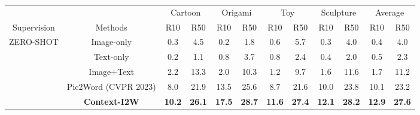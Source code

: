 \documentclass[letterpaper]{article} \usepackage{aaai24}  \usepackage{times}  \usepackage{helvet}  \usepackage{courier}  \usepackage[hyphens]{url}  \usepackage{graphicx} \urlstyle{rm} \def\UrlFont{\rm}  \usepackage{natbib}  \usepackage{caption} \frenchspacing  \setlength{\pdfpagewidth}{8.5in} \setlength{\pdfpageheight}{11in} \usepackage{algorithm}
\begin{document}
\begin{table*}[t]
\centering
\scalebox{1.11}
{\scriptsize
\begin{tabular}{cccccccccccc}
\toprule
                           &              & \multicolumn{2}{c}{Cartoon}                       & \multicolumn{2}{c}{Origami}                        & \multicolumn{2}{c}{Toy}                            & \multicolumn{2}{c}{Sculpture}                      & \multicolumn{2}{c}{Average}   \\  \cmidrule(lr){3-4}\cmidrule(lr){5-6}\cmidrule(lr){7-8}\cmidrule(lr){9-10}\cmidrule(lr){11-12}
Supervision                & Methods      & R10          & R50                                & R10           & R50                                & R10           & R50                                & R10           & R50                                & R10           & R50           \\ \hline
\multirow{5}{*}{ZERO-SHOT} & Image-only   & 0.3          & \multicolumn{1}{c|}{4.5}           & 0.2           & \multicolumn{1}{c|}{1.8}           & 0.6           & \multicolumn{1}{c|}{5.7}           & 0.3           & \multicolumn{1}{c|}{4.0}           & 0.4           & 4.0           \\
                           & Text-only    & 0.2          & \multicolumn{1}{c|}{1.1}           & 0.8           & \multicolumn{1}{c|}{3.7}           & 0.8           & \multicolumn{1}{c|}{2.4}           & 0.4           & \multicolumn{1}{c|}{2.0}           & 0.5           & 2.3           \\
                           & Image+Text   & 2.2          & \multicolumn{1}{c|}{13.3}          & 2.0           & \multicolumn{1}{c|}{10.3}          & 1.2           & \multicolumn{1}{c|}{9.7}           & 1.6           & \multicolumn{1}{c|}{11.6}          & 1.7           & 11.2          \\
                           & Pic2Word (CVPR 2023)    & 8.0          & \multicolumn{1}{c|}{21.9}          & 13.5          & \multicolumn{1}{c|}{25.6}          & 8.7           & \multicolumn{1}{c|}{21.6}          & 10.0          & \multicolumn{1}{c|}{23.8}          & 10.1          & 23.2          \\ 
                           & \textbf{Context-I2W} & \textbf{10.2} & \multicolumn{1}{c|}{\textbf{26.1}} & \textbf{17.5} & \multicolumn{1}{c|}{\textbf{28.7}} & \textbf{11.6} & \multicolumn{1}{c|}{\textbf{27.4}} & \textbf{12.1} & \multicolumn{1}{c|}{\textbf{28.2}} & \textbf{12.9} & \textbf{27.6} \\ \cmidrule(lr){1-12}

\end{tabular}}
\end{table*}
\end{document}

